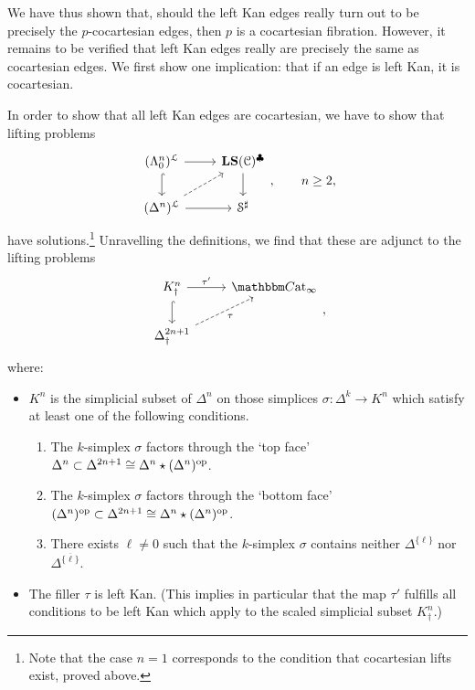\documentclass[main.tex]{subfiles}
\begin{document}
We have thus shown that, should the left Kan edges really turn out to be precisely the $p$-cocartesian edges, then $p$ is a cocartesian fibration. However, it remains to be verified that left Kan edges really are precisely the same as cocartesian edges. We first show one implication: that if an edge is left Kan, it is cocartesian.

In order to show that all left Kan edges are cocartesian, we have to show that lifting problems
\begin{equation*}
  \begin{tikzcd}
    (\Lambda^{n}_{0})^{\mathcal{L}}
    \arrow[r]
    \arrow[d, hook]
    & \LS(\category{C})^{\clubsuit}
    \arrow[d]
    \\
    (\Delta^{n})^{\mathcal{L}}
    \arrow[r]
    \arrow[ur, dashed]
    & \S^{\sharp}
  \end{tikzcd},\qquad n \geq 2,
\end{equation*}
have solutions.\footnote{Note that the case $n=1$ corresponds to the condition that cocartesian lifts exist, proved above.} Unravelling the definitions, we find that these are adjunct to the lifting problems
\begin{equation}
  \label{eq:challenging_filling_problem}
  \begin{tikzcd}
    K^{n}_{\dagger}
    \arrow[d, hook]
    \arrow[r, "\tau'"]
    & \ICCat
    \\
    \Delta^{2n+1}_{\dagger}
    \arrow[ur, dashed, swap, "\tau"]
  \end{tikzcd},
\end{equation}
where:
\begin{itemize}
  \item $K^{n}$ is the simplicial subset of $\Delta^{n}$ on those simplices $\sigma\colon \Delta^{k} \to K^{n}$ which satisfy at least one of the following conditions.
    \begin{enumerate}
      \item The $k$-simplex $\sigma$ factors through the `top face' $\Delta^{n} \subset \Delta^{2n+1} \cong \Delta^{n} \star (\Delta^{n})^{\mathrm{op}}$.

      \item The $k$-simplex $\sigma$ factors through the `bottom face' $(\Delta^{n})^{\mathrm{op}} \subset \Delta^{2n+1} \cong \Delta^{n} \star (\Delta^{n})^{\mathrm{op}}$.

      \item There exists $\ell \neq 0$ such that the $k$-simplex $\sigma$ contains neither $\Delta^{\{\ell\}}$ nor $\Delta^{\{\overline{\ell}\}}$.
    \end{enumerate}


  \item The filler $\tau$ is left Kan. (This implies in particular that the map $\tau'$ fulfills all conditions to be left Kan which apply to the scaled simplicial subset $K^{n}_{\dagger}$.)
\end{itemize}
\end{document}
